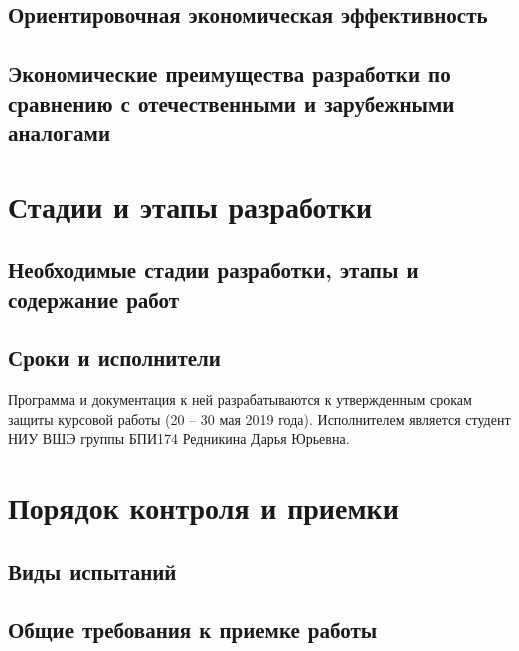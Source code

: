 \documentclass[a4paper,12pt]{article}
\begin{document}
	\subsection{Ориентировочная экономическая эффективность}
	\subsection{Экономические преимущества разработки по сравнению с отечественными и зарубежными аналогами}
	
						\newpage
	\section{Стадии и этапы разработки}
	\subsection{Необходимые стадии разработки, этапы и содержание работ}
	\subsection{Сроки и исполнители}
	Программа и документация к ней разрабатываются к утвержденным срокам защиты курсовой работы (20 – 30 мая 2019 года).
	Исполнителем является студент НИУ ВШЭ группы БПИ174 Редникина Дарья Юрьевна.
	
						\newpage
	\section{Порядок контроля и приемки}
	\subsection{Виды испытаний}
	\subsection{Общие требования к приемке работы}
	
						\newpage
	\listRegistration
\end{document}
